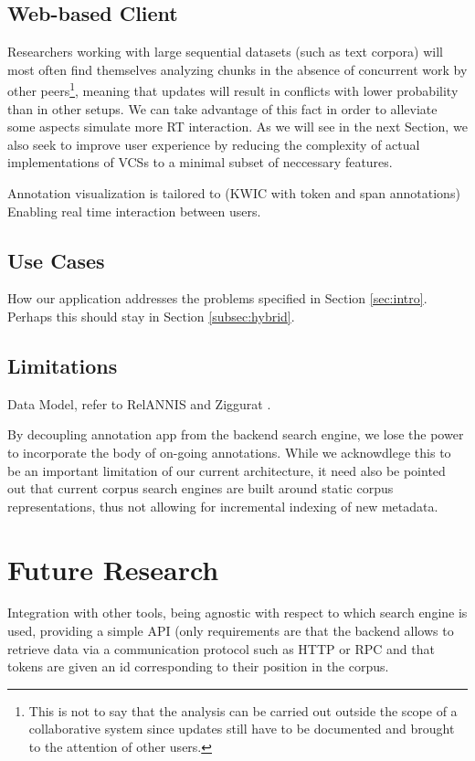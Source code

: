 \documentclass{sig-alternate}
\begin{document}
\subsection{Web-based Client}\label{subsec:client}

Researchers working with large sequential datasets (such as text corpora) will most often find
themselves analyzing chunks in the absence of concurrent work by other peers\footnote{
  This is not to say that the analysis can be carried out outside the scope of a collaborative system
  since updates still have to be documented and brought to the attention of other users.
}, meaning that updates will result in conflicts with lower probability than in other setups.
We can take advantage of this fact in order to alleviate some aspects 
simulate more RT interaction.
As we will see in the next Section, we also seek to improve user experience by reducing the
complexity of actual implementations of VCSs to a minimal subset of neccessary features.

Annotation visualization is tailored to (KWIC with token and span annotations)
Enabling real time interaction between users. 

\subsection{Use Cases}
How our application addresses the problems specified in Section \ref{sec:intro}. Perhaps this
should stay in Section \ref{subsec:hybrid}.

\subsection{Limitations}
Data Model, refer to RelANNIS and Ziggurat \cite{Krause2016,Evert2015}.

By decoupling annotation app from the backend search engine, we lose the power to incorporate
the body of on-going annotations.
While we acknowdlege this to be an important limitation of our current architecture, it need
also be pointed out that current corpus search engines are built around static corpus
representations, thus not allowing for incremental indexing of new metadata.

\section{Future Research}\label{sec:future}
Integration with other tools, being agnostic with respect to which search engine is used,
providing a simple API (only requirements are that the backend allows to retrieve data via
a communication protocol such as HTTP or RPC and that tokens are given an id corresponding
to their position in the corpus.
\end{document}
